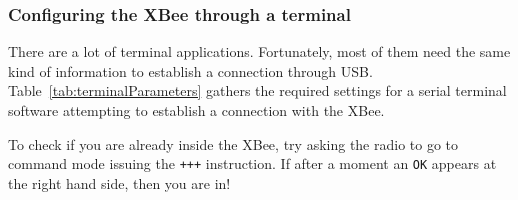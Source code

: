 \begin{table}[htbp]
	\centering
	\caption{XBee AT modes}
	\label{tab:xbeeATModes}
\end{table}

\subsubsection{Configuring the XBee through a terminal }

There are a lot of terminal applications. Fortunately, most of them need the same kind of information to establish a connection through USB. Table~\ref{tab:terminalParameters} gathers the required settings for a serial terminal software attempting to establish a connection with the XBee.

\begin{table}[htbp]
	\centering
	\caption{Default terminal settings for establishing a connection with an XBee}
	\label{tab:terminalParameters}
\end{table}

To check if you are already inside the XBee, try asking the radio to go to command mode issuing the \texttt{+++} instruction. If after a moment an \texttt{OK} appears at the right hand side, then you are in!

